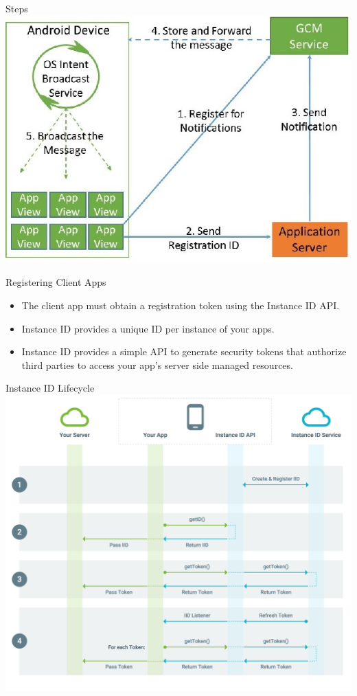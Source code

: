 \documentclass[10pt]{beamer}
\begin{document}
\begin{frame}[fragile]{Steps}
  \includegraphics[width=\textwidth]{Steps.jpg}
\end{frame}
\begin{frame}[fragile]{Registering Client Apps}
  	\begin{itemize}
  		\item The client app must obtain a registration token using the Instance ID API.
  		\item Instance ID provides a unique ID per instance of your apps. 
  		\item Instance ID provides a simple API to generate security tokens that authorize third parties to access your app's server side managed resources.
  	\end{itemize}
\end{frame}
\begin{frame}[fragile]{Instance ID Lifecycle}
  \includegraphics[width=\textwidth-10mm]{iid-lifecycle.png}
\end{frame}
\end{document}
